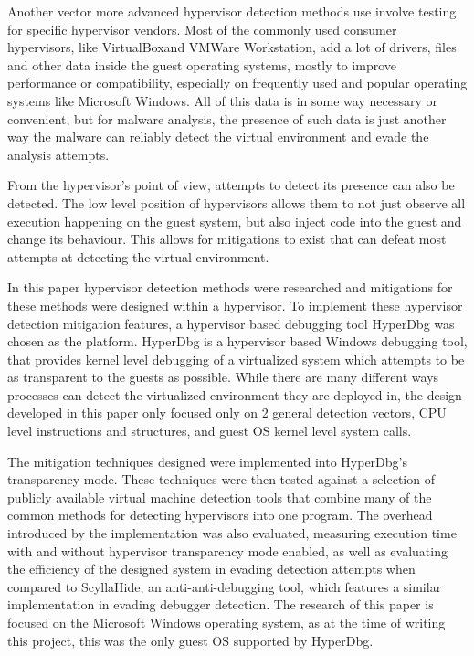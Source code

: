 Another vector more advanced hypervisor detection methods use involve testing for specific hypervisor vendors. Most of the commonly used consumer hypervisors, like VirtualBox\texttrademark and VMWare Workstation\texttrademark, 
add a lot of drivers, files and other data inside the guest operating systems, mostly to improve performance or compatibility, especially on frequently used and popular operating systems like Microsoft Windows. 
All of this data is in some way necessary or convenient, but for malware analysis, the presence of such data is just another way the malware can reliably detect the virtual environment and evade the analysis attempts.

From the hypervisor's point of view, attempts to detect its presence can also be detected. The low level position of hypervisors allows them to not just observe all execution happening on the guest system, 
but also inject code into the guest and change its behaviour. This allows for mitigations to exist that can defeat most attempts at detecting the virtual environment.

In this paper hypervisor detection methods were researched and mitigations for these methods were designed within a hypervisor. To implement these hypervisor detection mitigation features, 
a hypervisor based debugging tool HyperDbg was chosen as the platform. HyperDbg is a hypervisor based Windows debugging tool, that provides kernel level debugging of a virtualized system which attempts to be as transparent to the guests as possible.
While there are many different ways processes can detect the virtualized environment they are deployed in, the design developed in this paper only focused only on 2 general detection vectors, 
CPU level instructions and structures, and guest OS kernel level system calls.

The mitigation techniques designed were implemented into HyperDbg’s transparency mode. 
These techniques were then tested against a selection of publicly available virtual machine detection tools that combine many of the common methods for detecting hypervisors into one program. The overhead introduced by the implementation was also evaluated, measuring execution time with and without hypervisor transparency mode enabled, as well as evaluating the efficiency of the designed system in evading detection attempts when compared to ScyllaHide, an anti-anti-debugging tool, which features a similar implementation in evading debugger detection.
The research of this paper is focused on the Microsoft Windows operating system, as at the time of writing this project, this was the only guest OS supported by HyperDbg.

